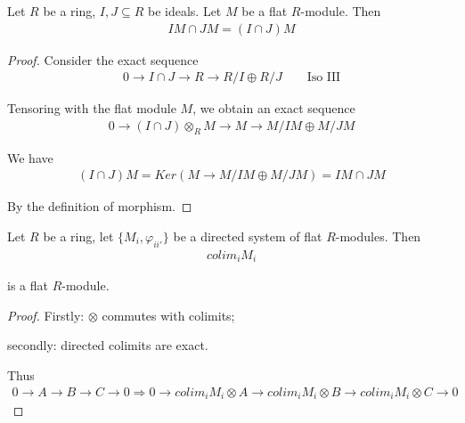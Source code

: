 \documentclass[Total.tex]{subfiles}
\begin{document}
				
				\begin{lemma}
					Let $R$ be a ring, $I,J\subseteq R$ be ideals. Let $M$ be a flat $R$-module. Then
					\begin{gather*}
						IM\cap JM=(I\cap J) M
					\end{gather*}
				\end{lemma}
				\begin{proof}
					Consider the exact sequence
					\begin{gather*}
						0\rightarrow I\cap J\rightarrow R\rightarrow R/I\oplus R/J\qquad\mbox{Iso III}
					\end{gather*}
					
					Tensoring with the flat module $M$, we obtain an exact sequence
					\begin{gather*}
						0\rightarrow(I\cap J)\otimes_R M\rightarrow M\rightarrow M/IM\oplus M/JM
					\end{gather*}
					
					We have
					\begin{gather*}
						(I\cap J)M=Ker(M\rightarrow M/IM\oplus M/JM)=IM\cap JM
					\end{gather*}
					
					By the definition of morphism.
				\end{proof}
				
				\begin{lemma}
					Let $R$ be a ring, let $\{M_i,\varphi_{ii'}\}$ be a directed system of flat $R$-modules. Then
					\begin{gather*}
						colim_i M_i
					\end{gather*}
					
					is a flat $R$-module.
				\end{lemma}
				\begin{proof}
					Firstly: $\otimes$ commutes with colimits;
					
					secondly: directed colimits are exact.
					
					Thus
					\begin{gather*}
						0\rightarrow A\rightarrow B\rightarrow C\rightarrow 0\Rightarrow 0\rightarrow colim_i M_i\otimes A\rightarrow colim_i M_i\otimes B\rightarrow colim_i M_i\otimes C\rightarrow 0
					\end{gather*}
				\end{proof}
				
\end{document}
